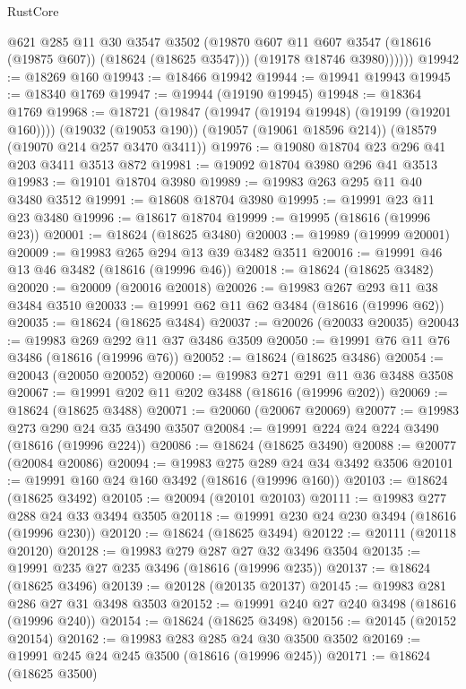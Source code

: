 \begin{lexlean}{RustCore}
\begin{coremodule}
              @621
              @285
              @11
              @30
              @3547
              @3502
              (@19870 @607 @11 @607 @3547 (@18616 (@19875 @607)) (@18624 (@18625 @3547)))
              (@19178 @18746 @3980))))))
@19942 := @18269 @160
@19943 := @18466 @19942
@19944 := @19941 @19943
@19945 := @18340 @1769
@19947 := @19944 (@19190 @19945)
@19948 := @18364 @1769
@19968 := @18721
    (@19847 (@19947 (@19194 @19948) (@19199 (@19201 @160))))
    (@19032 (@19053 @190))
    (@19057 (@19061 @18596 @214))
    (@18579 (@19070 @214 @257 @3470 @3411))
@19976 := @19080 @18704 @23 @296 @41 @203 @3411 @3513 @872
@19981 := @19092 @18704 @3980 @296 @41 @3513
@19983 := @19101 @18704 @3980
@19989 := @19983 @263 @295 @11 @40 @3480 @3512
@19991 := @18608 @18704 @3980
@19995 := @19991 @23 @11 @23 @3480
@19996 := @18617 @18704
@19999 := @19995 (@18616 (@19996 @23))
@20001 := @18624 (@18625 @3480)
@20003 := @19989 (@19999 @20001)
@20009 := @19983 @265 @294 @13 @39 @3482 @3511
@20016 := @19991 @46 @13 @46 @3482 (@18616 (@19996 @46))
@20018 := @18624 (@18625 @3482)
@20020 := @20009 (@20016 @20018)
@20026 := @19983 @267 @293 @11 @38 @3484 @3510
@20033 := @19991 @62 @11 @62 @3484 (@18616 (@19996 @62))
@20035 := @18624 (@18625 @3484)
@20037 := @20026 (@20033 @20035)
@20043 := @19983 @269 @292 @11 @37 @3486 @3509
@20050 := @19991 @76 @11 @76 @3486 (@18616 (@19996 @76))
@20052 := @18624 (@18625 @3486)
@20054 := @20043 (@20050 @20052)
@20060 := @19983 @271 @291 @11 @36 @3488 @3508
@20067 := @19991 @202 @11 @202 @3488 (@18616 (@19996 @202))
@20069 := @18624 (@18625 @3488)
@20071 := @20060 (@20067 @20069)
@20077 := @19983 @273 @290 @24 @35 @3490 @3507
@20084 := @19991 @224 @24 @224 @3490 (@18616 (@19996 @224))
@20086 := @18624 (@18625 @3490)
@20088 := @20077 (@20084 @20086)
@20094 := @19983 @275 @289 @24 @34 @3492 @3506
@20101 := @19991 @160 @24 @160 @3492 (@18616 (@19996 @160))
@20103 := @18624 (@18625 @3492)
@20105 := @20094 (@20101 @20103)
@20111 := @19983 @277 @288 @24 @33 @3494 @3505
@20118 := @19991 @230 @24 @230 @3494 (@18616 (@19996 @230))
@20120 := @18624 (@18625 @3494)
@20122 := @20111 (@20118 @20120)
@20128 := @19983 @279 @287 @27 @32 @3496 @3504
@20135 := @19991 @235 @27 @235 @3496 (@18616 (@19996 @235))
@20137 := @18624 (@18625 @3496)
@20139 := @20128 (@20135 @20137)
@20145 := @19983 @281 @286 @27 @31 @3498 @3503
@20152 := @19991 @240 @27 @240 @3498 (@18616 (@19996 @240))
@20154 := @18624 (@18625 @3498)
@20156 := @20145 (@20152 @20154)
@20162 := @19983 @283 @285 @24 @30 @3500 @3502
@20169 := @19991 @245 @24 @245 @3500 (@18616 (@19996 @245))
@20171 := @18624 (@18625 @3500)

\end{coremodule}
\end{lexlean}

